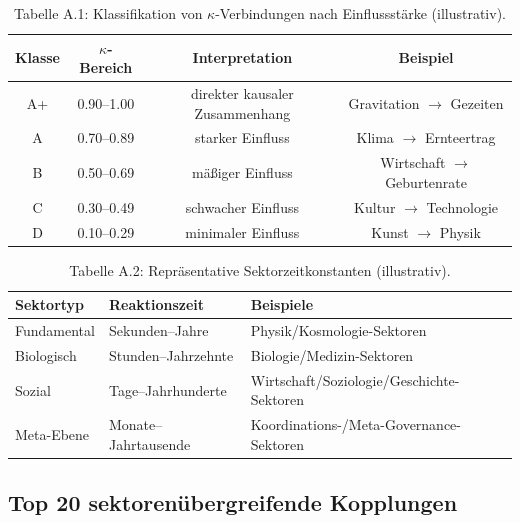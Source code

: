 \documentclass[13pt,a4paper]{article}
\begin{document}
	\begin{table}[htbp]
		\centering
		\small
		\begin{tabular}{cccc}
			\toprule
			\textbf{Klasse} & \textbf{$\kappa$-Bereich} & \textbf{Interpretation} & \textbf{Beispiel} \\
			\midrule
			A+ & 0.90--1.00 & direkter kausaler Zusammenhang & Gravitation $\rightarrow$ Gezeiten \\
			A  & 0.70--0.89 & starker Einfluss & Klima $\rightarrow$ Ernteertrag \\
			B  & 0.50--0.69 & mäßiger Einfluss & Wirtschaft $\rightarrow$ Geburtenrate \\
			C  & 0.30--0.49 & schwacher Einfluss & Kultur $\rightarrow$ Technologie \\
			D  & 0.10--0.29 & minimaler Einfluss & Kunst $\rightarrow$ Physik \\
			\bottomrule
		\end{tabular}
		\caption{Tabelle A.1: Klassifikation von $\kappa$-Verbindungen nach Einflussstärke (illustrativ).}
	\end{table}
	
	\begin{table}[htbp]
		\centering
		\small
		\begin{tabular}{p{}p{}p{}}
			\toprule
			\textbf{Sektortyp} & \textbf{Reaktionszeit} & \textbf{Beispiele} \\
			\midrule
			Fundamental & Sekunden--Jahre & Physik/Kosmologie-Sektoren \\
			Biologisch  & Stunden--Jahrzehnte & Biologie/Medizin-Sektoren \\
			Sozial      & Tage--Jahrhunderte & Wirtschaft/Soziologie/Geschichte-Sektoren \\
			Meta-Ebene  & Monate--Jahrtausende & Koordinations-/Meta-Governance-Sektoren \\
			\bottomrule
		\end{tabular}
		\caption{Tabelle A.2: Repräsentative Sektorzeitkonstanten (illustrativ).}
	\end{table}
	
	\subsection*{Top 20 sektorenübergreifende Kopplungen}
	
\end{document}
